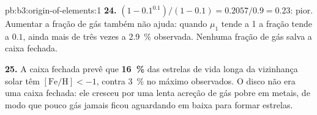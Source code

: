\begin{solution}{pb:b3:origin-of-elements:1}
\textbf{24.} $(1 - 0.1^{0.1})/(1 - 0.1) = 0.2057/0.9 = \num{0.23}$: pior.
Aumentar a fração de gás também não ajuda: quando $\mu_1$ tende a 1
a fração tende a $0.1$, ainda mais de três vezes a
\qty{2.9}{\percent} observada. Nenhuma fração de gás salva a caixa fechada.

\textbf{25.} A caixa fechada prevê que
\textbf{\qty[text-series-to-math=true]{16}{\percent}} das estrelas de vida longa
da vizinhança solar têm $[\mathrm{Fe/H}] < -1$, contra
\qty{3}{\percent} no máximo observados. O disco não era uma caixa fechada: ele
cresceu por uma lenta acreção de gás pobre em metais, de modo que pouco gás jamais ficou
aguardando em baixa  para formar estrelas.
\end{solution}
